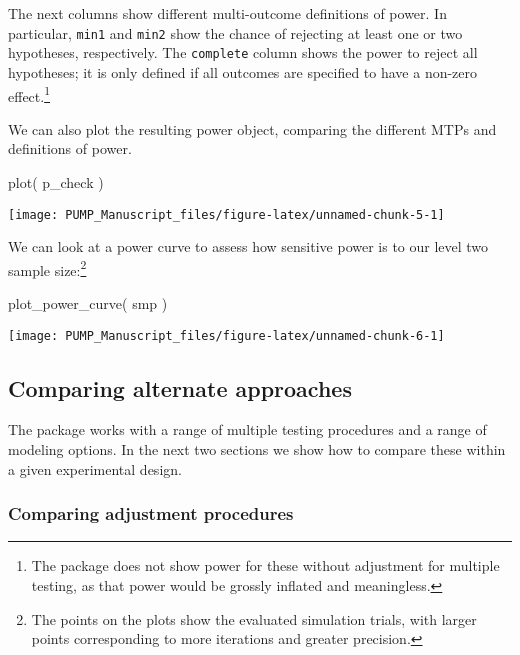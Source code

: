 \documentclass[
]{article}
\newenvironment{Shaded}{\begin{snugshade}}{\end{snugshade}}
\newcommand{\FunctionTok}[1]{\textcolor[rgb]{0.00,0.00,0.00}{#1}}
\newcommand{\NormalTok}[1]{#1}
\begin{document}
The next columns show different multi-outcome definitions of power. In
particular, \texttt{min1} and \texttt{min2} show the chance of rejecting
at least one or two hypotheses, respectively. The \texttt{complete}
column shows the power to reject all hypotheses; it is only defined if
all outcomes are specified to have a non-zero
effect.\footnote{The package does not show power for these without adjustment for multiple testing, as that power would be grossly inflated and meaningless.}

We can also plot the resulting power object, comparing the different
MTPs and definitions of power.

\begin{Shaded}
\begin{Highlighting}[]
\FunctionTok{plot}\NormalTok{( p\_check )}
\end{Highlighting}
\end{Shaded}

\begin{center}\texttt{[image: PUMP\_Manuscript\_files/figure-latex/unnamed-chunk-5-1]} \end{center}

We can look at a power curve to assess how sensitive power is to our
level two sample
size:\footnote{The points on the plots show the evaluated simulation trials, with larger points corresponding to more iterations and greater precision.}

\begin{Shaded}
\begin{Highlighting}[]
\FunctionTok{plot\_power\_curve}\NormalTok{( smp )}
\end{Highlighting}
\end{Shaded}

\begin{center}\texttt{[image: PUMP\_Manuscript\_files/figure-latex/unnamed-chunk-6-1]} \end{center}

\subsection{Comparing alternate approaches}

The package works with a range of multiple testing procedures and a
range of modeling options. In the next two sections we show how to
compare these within a given experimental design.

\subsubsection{Comparing adjustment procedures}
\end{document}
